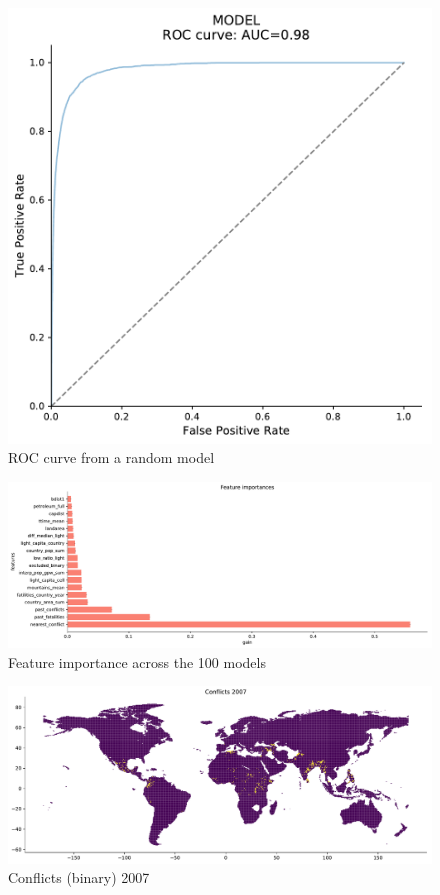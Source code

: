 \documentclass[a4paper]{article}
\begin{document}
\begin{figure}[!htb]
	\centering
	\includegraphics[scale=0.4]{roc_out_20.pdf}
    \caption{\footnotesize{ROC curve from a random model}}%
\end{figure}

\begin{figure}[!htb]
	\centering
	\includegraphics[scale=0.4]{feature_imp_out_20.pdf}
    \caption{\footnotesize{Feature importance across the 100 models}}%
\end{figure}

\begin{figure}[!htb]
	\centering
	\includegraphics[scale=0.4]{conflicts_2007.pdf}
    \caption{\footnotesize{Conflicts (binary) 2007}}%
\end{figure}
\end{document}

